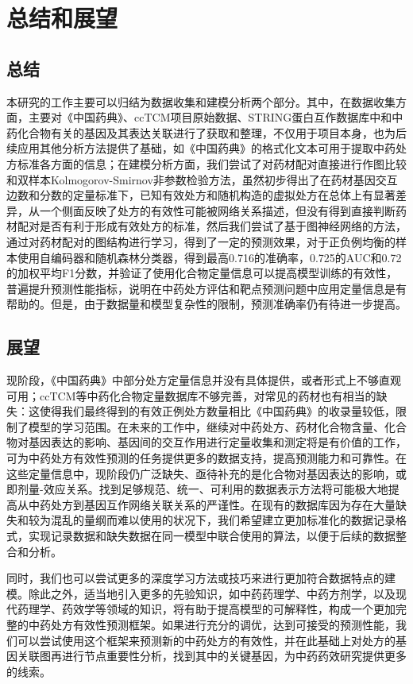 
\chapter{总结和展望}

\section{总结}

本研究的工作主要可以归结为数据收集和建模分析两个部分。其中，在数据收集方面，主要对《中国药典》、ccTCM项目原始数据、STRING蛋白互作数据库中和中药化合物有关的基因及其表达关联进行了获取和整理，不仅用于项目本身，也为后续应用其他分析方法提供了基础，如《中国药典》的格式化文本可用于提取中药处方标准各方面的信息；在建模分析方面，我们尝试了对药材配对直接进行作图比较和双样本Kolmogorov-Smirnov非参数检验方法，虽然初步得出了在药材基因交互边数和分数的定量标准下，已知有效处方和随机构造的虚拟处方在总体上有显著差异，从一个侧面反映了处方的有效性可能被网络关系描述，但没有得到直接判断药材配对是否有利于形成有效处方的标准，然后我们尝试了基于图神经网络的方法，通过对药材配对的图结构进行学习，得到了一定的预测效果，对于正负例均衡的样本使用自编码器和随机森林分类器，得到最高0.716的准确率，0.725的AUC和0.72的加权平均F1分数，并验证了使用化合物定量信息可以提高模型训练的有效性，普遍提升预测性能指标，说明在中药处方评估和靶点预测问题中应用定量信息是有帮助的。但是，由于数据量和模型复杂性的限制，预测准确率仍有待进一步提高。

\section{展望}

现阶段，《中国药典》中部分处方定量信息并没有具体提供，或者形式上不够直观可用；ccTCM等中药化合物定量数据库不够完善，对常见的药材也有相当的缺失：这使得我们最终得到的有效正例处方数量相比《中国药典》的收录量较低，限制了模型的学习范围。在未来的工作中，继续对中药处方、药材化合物含量、化合物对基因表达的影响、基因间的交互作用进行定量收集和测定将是有价值的工作，可为中药处方有效性预测的任务提供更多的数据支持，提高预测能力和可靠性。在这些定量信息中，现阶段仍广泛缺失、亟待补充的是化合物对基因表达的影响，或即剂量-效应关系。找到足够规范、统一、可利用的数据表示方法将可能极大地提高从中药处方到基因互作网络关联关系的严谨性。在现有的数据库因为存在大量缺失和较为混乱的量纲而难以使用的状况下，我们希望建立更加标准化的数据记录格式，实现记录数据和缺失数据在同一模型中联合使用的算法，以便于后续的数据整合和分析。

同时，我们也可以尝试更多的深度学习方法或技巧来进行更加符合数据特点的建模。除此之外，适当地引入更多的先验知识，如中药药理学、中药方剂学，以及现代药理学、药效学等领域的知识，将有助于提高模型的可解释性，构成一个更加完整的中药处方有效性预测框架。如果进行充分的调优，达到可接受的预测性能，我们可以尝试使用这个框架来预测新的中药处方的有效性，并在此基础上对处方的基因关联图再进行节点重要性分析，找到其中的关键基因，为中药药效研究提供更多的线索。